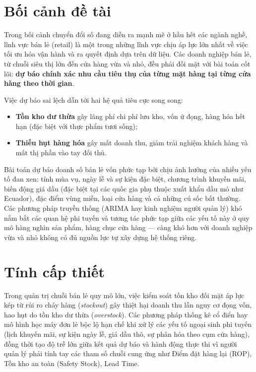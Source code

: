 \documentclass[12pt,a4paper]{report}
\begin{document}
\section*{Bối cảnh đề tài}

Trong bối cảnh chuyển đổi số đang diễn ra mạnh mẽ ở hầu hết các ngành nghề, lĩnh vực bán lẻ (retail) là một trong những lĩnh vực chịu áp lực lớn nhất về việc tối ưu hóa vận hành và ra quyết định dựa trên dữ liệu. Các doanh nghiệp bán lẻ, từ chuỗi siêu thị lớn đến cửa hàng vừa và nhỏ, đều phải đối mặt với bài toán cốt lõi: \textbf{dự báo chính xác nhu cầu tiêu thụ của từng mặt hàng tại từng cửa hàng theo thời gian}.

Việc dự báo sai lệch dẫn tới hai hệ quả tiêu cực song song:
\begin{itemize}
    \item \textbf{Tồn kho dư thừa} gây lãng phí chi phí lưu kho, vốn ứ đọng, hàng hóa hết hạn (đặc biệt với thực phẩm tươi sống);
    \item \textbf{Thiếu hụt hàng hóa} gây mất doanh thu, giảm trải nghiệm khách hàng và mất thị phần vào tay đối thủ.
\end{itemize}

Bài toán dự báo doanh số bán lẻ vốn phức tạp bởi chịu ảnh hưởng của nhiều yếu tố đan xen: tính mùa vụ, ngày lễ và sự kiện đặc biệt, chương trình khuyến mãi, biến động giá dầu (đặc biệt tại các quốc gia phụ thuộc xuất khẩu dầu mỏ như Ecuador), đặc điểm vùng miền, loại cửa hàng và cả những cú sốc bất thường. Các phương pháp truyền thống (ARIMA hay kinh nghiệm người quản lý) khó nắm bắt các quan hệ phi tuyến và tương tác phức tạp giữa các yếu tố này ở quy mô hàng nghìn sản phẩm, hàng chục cửa hàng --- càng khó hơn với doanh nghiệp vừa và nhỏ không có đủ nguồn lực tự xây dựng hệ thống riêng.

\section*{Tính cấp thiết}

Trong quản trị chuỗi bán lẻ quy mô lớn, việc kiểm soát tồn kho đối mặt áp lực kép từ rủi ro cháy hàng (\textit{stockout}) gây thiệt hại doanh thu lẫn nguy cơ đọng vốn, hao hụt do tồn kho dư thừa (\textit{overstock}). Các phương pháp thống kê cổ điển hay mô hình học máy đơn lẻ bộc lộ hạn chế khi xử lý các yếu tố ngoại sinh phi tuyến (lịch khuyến mãi, sự kiện ngày lễ, giá dầu thô, sự phân hóa theo cụm cửa hàng), đồng thời tạo độ trễ lớn giữa kết quả dự báo và hành động thực thi vì người quản lý phải tính tay các tham số chuỗi cung ứng như Điểm đặt hàng lại (ROP), Tồn kho an toàn (Safety Stock), Lead Time.
\end{document}
